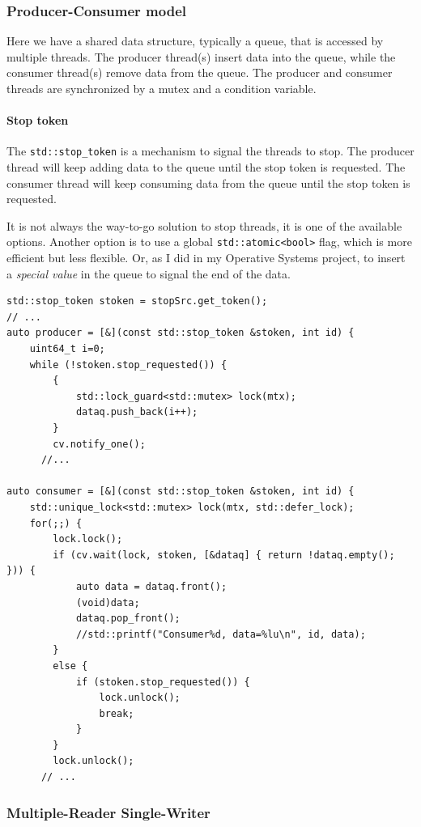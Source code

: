 \subsubsection{Producer-Consumer model}
Here we have a shared data structure, typically a queue, that is accessed by multiple threads. The producer thread(s) insert data into the queue, while the consumer thread(s) remove data from the queue. The producer and consumer threads are synchronized by a mutex and a condition variable.

\paragraph{Stop token}

The \lstinline|std::stop_token| is a mechanism to signal the threads to stop. The producer thread will keep adding data to the queue until the stop token is requested. The consumer thread will keep consuming data from the queue until the stop token is requested.

It is not always the way-to-go solution to stop threads, it is one of the available options.
Another option is to use a global \lstinline|std::atomic<bool>| flag, which is more efficient but less flexible.
Or, as I did in my Operative Systems project, to insert a \textit{special value} in the queue to signal the end of the data. 
   
   \begin{lstlisting}[caption={spm3/prod-cons.cpp}]
std::stop_token stoken = stopSrc.get_token();
// ...
auto producer = [&](const std::stop_token &stoken, int id) {	   
	uint64_t i=0;
	while (!stoken.stop_requested()) {
		{
			std::lock_guard<std::mutex> lock(mtx);
			dataq.push_back(i++);
		}
		cv.notify_one();
      //...

auto consumer = [&](const std::stop_token &stoken, int id) {
	std::unique_lock<std::mutex> lock(mtx, std::defer_lock);
	for(;;) {
		lock.lock();
		if (cv.wait(lock, stoken, [&dataq] { return !dataq.empty(); })) {
			auto data = dataq.front();
			(void)data;
			dataq.pop_front();
			//std::printf("Consumer%d, data=%lu\n", id, data);
		}
		else {
			if (stoken.stop_requested()) {
				lock.unlock();
				break;
			}
		}
		lock.unlock();
      // ...
\end{lstlisting}

\newpage
\subsubsection{Multiple-Reader Single-Writer}

